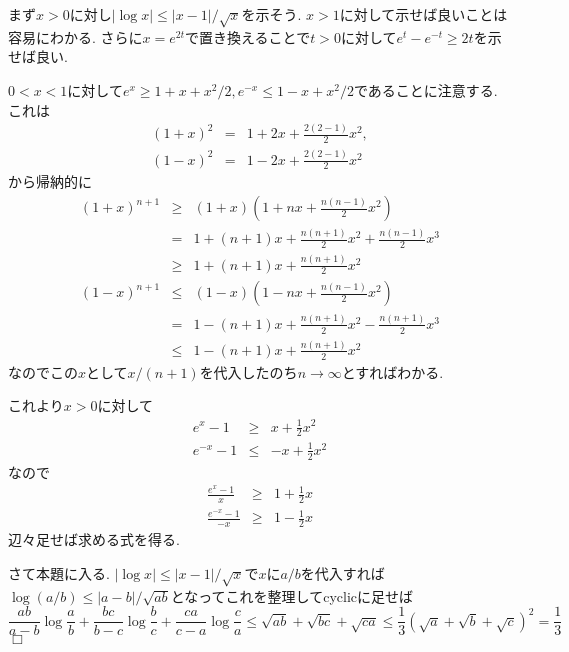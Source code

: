 \documentclass[uplatex, a5paper]{jsarticle}
\makeatletter
\theoremstyle{definition}
\renewenvironment{proof}[1][\proofname]{
  \pushQED{\qed}%
  \normalfont \topsep6\p@\@plus6\p@\relax
  \trivlist
  \item[\hskip\labelsep
    #1\@addpunct{\textbf{.}}]\ignorespaces
}{%
  \popQED\endtrivlist\@endpefalse
}
\providecommand{\proofname}{証明}
\def\qed{\hfill $\Box$}
\makeatother
\begin{document}
\begin{proof}

まず$x>0$に対し$|\log x | \leq | x-1 | / \sqrt{x}$を示そう.
$x>1$に対して示せば良いことは容易にわかる.
さらに$x=e^{2t}$で置き換えることで$t>0$に対して$e^t-e^{-t}\geq 2t$を示せば良い.

$0<x<1$に対して$e^x \geq 1+x+x^2/2 , e^{-x}\leq 1-x+x^2/2$であることに注意する.
これは
\begin{eqnarray*}
(1+x)^2 & = & 1+2x+\frac{2(2-1)}{2}x^2 , \\
(1-x)^2 & = & 1-2x+\frac{2(2-1)}{2}x^2
\end{eqnarray*}
から帰納的に
\begin{eqnarray*}
(1+x)^{n+1} & \geq  & (1+x)\left( 1+nx+\frac{n(n-1)}{2}x^2 \right) \\
& = & 1+(n+1)x+\frac{n(n+1)}{2}x^2+\frac{n(n-1)}{2}x^3 \\
& \geq & 1+(n+1)x+\frac{n(n+1)}{2}x^2 \\
(1-x)^{n+1} & \leq  & (1-x)\left( 1-nx+\frac{n(n-1)}{2}x^2 \right) \\
& = & 1-(n+1)x+\frac{n(n+1)}{2}x^2-\frac{n(n+1)}{2}x^3 \\
& \leq & 1-(n+1)x+\frac{n(n+1)}{2}x^2
\end{eqnarray*}
なのでこの$x$として$x/(n+1)$を代入したのち$n\to \infty$とすればわかる.

これより$x>0$に対して
\begin{eqnarray*}
e^x - 1 & \geq & x+\frac{1}{2}x^2  \\
e^{-x} - 1 & \leq & -x+\frac{1}{2}x^2
\end{eqnarray*}
なので
\begin{eqnarray*}
\frac{e^x - 1}{x} & \geq & 1+\frac{1}{2}x  \\
\frac{e^{-x} - 1}{-x} & \geq & 1-\frac{1}{2}x
\end{eqnarray*}
辺々足せば求める式を得る.

さて本題に入る.
$|\log x | \leq | x-1 | / \sqrt{x}$で$x$に$a/b$を代入すれば
$\log (a/b) \leq |a-b|/\sqrt{ab}$となってこれを整理してcyclicに足せば
$$
\frac{ab}{a-b}\log \frac{a}{b} + \frac{bc}{b-c} \log \frac{b}{c} + \frac{ca}{c-a}\log \frac{c}{a} \leq \sqrt{ab} + \sqrt{bc} + \sqrt{ca} \leq \frac{1}{3}(\sqrt{a} + \sqrt{b} + \sqrt{c})^2 = \frac{1}{3}
$$
\qed
\end{proof}



\



\newpage
\end{document}

